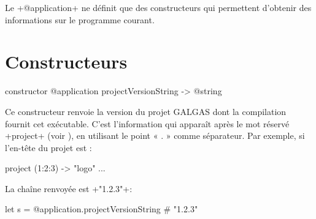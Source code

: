 

Le \ggs+@application+ ne définit que des constructeurs qui permettent d'obtenir des informations sur le programme courant.


\section{Constructeurs}


\begin{galgasbox}
constructor @application projectVersionString -> @string
\end{galgasbox}

Ce constructeur renvoie la version du projet GALGAS dont la compilation fournit cet exécutable. C'est l'information qui apparaît après le mot réservé \ggs+project+ (voir ), en utilisant le point « . » comme séparateur. Par exemple, si l'en-tête du projet est :

\begin{galgas}
project (1:2:3) -> "logo" {
  ...
}
\end{galgas}

La chaîne renvoyée est \ggs+"1.2.3"+:
\begin{galgas}
let s = @application.projectVersionString # "1.2.3"
\end{galgas}



